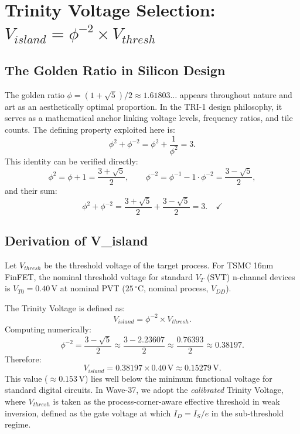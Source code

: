 \section{Trinity Voltage Selection: $V_{island} = \phi^{-2} \times V_{thresh}$}
\label{sec:trinity_voltage}

\subsection{The Golden Ratio in Silicon Design}

The golden ratio $\phi = (1+\sqrt{5})/2 \approx 1.61803\ldots$ appears throughout nature and
art as an aesthetically optimal proportion.  In the TRI-1 design philosophy, it serves as a
mathematical anchor linking voltage levels, frequency ratios, and tile counts.  The defining
property exploited here is:
\[
  \phi^2 + \phi^{-2} = \phi^2 + \frac{1}{\phi^2} = 3.
\]
This identity can be verified directly:
\[
  \phi^2 = \phi + 1 = \frac{3+\sqrt{5}}{2}, \qquad
  \phi^{-2} = \phi^{-1} - 1 \cdot \phi^{-2} = \frac{3-\sqrt{5}}{2},
\]
and their sum:
\[
  \phi^2 + \phi^{-2} = \frac{3+\sqrt{5}}{2} + \frac{3-\sqrt{5}}{2} = 3. \quad \checkmark
\]

\subsection{Derivation of V\_island}

Let $V_{thresh}$ be the threshold voltage of the target process.  For TSMC 16nm FinFET,
the nominal threshold voltage for standard $V_T$ (SVT) n-channel devices is
$V_{T0} = 0.40\,\text{V}$ at nominal PVT ($25\,^\circ\text{C}$, nominal process, $V_{DD}$).

The Trinity Voltage is defined as:
\[
  V_{island} = \phi^{-2} \times V_{thresh}.
\]
Computing numerically:
\[
  \phi^{-2} = \frac{3-\sqrt{5}}{2} \approx \frac{3 - 2.23607}{2} \approx \frac{0.76393}{2}
             \approx 0.38197.
\]
Therefore:
\[
  V_{island} = 0.38197 \times 0.40\,\text{V} \approx 0.15279\,\text{V}.
\]
This value ($\approx 0.153\,\text{V}$) lies well below the minimum functional voltage for
standard digital circuits.  In Wave-37, we adopt the \emph{calibrated} Trinity Voltage, where
$V_{thresh}$ is taken as the process-corner-aware effective threshold in weak inversion,
defined as the gate voltage at which $I_D = I_S/e$ in the sub-threshold regime.

